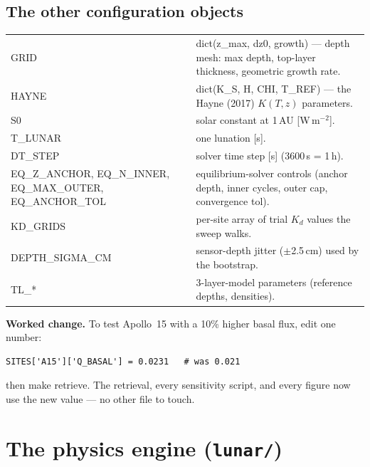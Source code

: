 \documentclass[11pt]{report}
\newcommand{\code}[1]{{\ttfamily\small #1}}
\begin{document}
\section{The other configuration objects}

\begin{center}\small
\begin{tabular}{@{}p{3.9cm}p{9.6cm}@{}}
\toprule
\code{GRID} & \code{dict(z\_max, dz0, growth)} --- depth mesh: max depth, top-layer thickness, geometric growth rate. \\
\code{HAYNE} & \code{dict(K\_S, H, CHI, T\_REF)} --- the Hayne (2017) $K(T,z)$ parameters. \\
\code{S0} & solar constant at 1\,AU [W\,m$^{-2}$]. \\
\code{T\_LUNAR} & one lunation [s]. \\
\code{DT\_STEP} & solver time step [s] (3600\,s = 1\,h). \\
\code{EQ\_Z\_ANCHOR, EQ\_N\_INNER, EQ\_MAX\_OUTER, EQ\_ANCHOR\_TOL} & equilibrium-solver controls (anchor depth, inner cycles, outer cap, convergence tol). \\
\code{KD\_GRIDS} & per-site array of trial $K_d$ values the sweep walks. \\
\code{DEPTH\_SIGMA\_CM} & sensor-depth jitter ($\pm$2.5\,cm) used by the bootstrap. \\
\code{TL\_*} & 3-layer-model parameters (reference depths, densities). \\
\bottomrule
\end{tabular}
\end{center}

\begin{tipbox}
\textbf{Worked change.} To test Apollo~15 with a 10\% higher basal flux,
edit one number:
\begin{lstlisting}[style=py]
SITES['A15']['Q_BASAL'] = 0.0231   # was 0.021
\end{lstlisting}
then \code{make retrieve}. The retrieval, every sensitivity script, and
every figure now use the new value --- no other file to touch.
\end{tipbox}

\chapter{The physics engine (\texttt{lunar/})}
\end{document}
